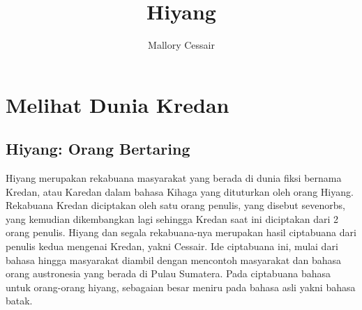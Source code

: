 \documentclass[12pt]{report}
\title{Hiyang}
\author{Mallory Cessair}
\begin{document}
 
\maketitle

\chapter{Melihat Dunia Kredan}
\section{Hiyang: Orang Bertaring}
Hiyang merupakan rekabuana masyarakat yang berada di dunia fiksi bernama Kredan, atau Karedan dalam bahasa Kihaga yang dituturkan oleh orang Hiyang. Rekabuana Kredan diciptakan oleh satu orang penulis, yang disebut sevenorbs, yang kemudian dikembangkan lagi sehingga Kredan saat ini diciptakan dari 2 orang penulis. Hiyang dan segala rekabuana-nya merupakan hasil ciptabuana dari penulis kedua mengenai Kredan, yakni Cessair. Ide ciptabuana ini, mulai dari bahasa hingga masyarakat diambil dengan mencontoh masyarakat dan bahasa orang austronesia yang berada di Pulau Sumatera. Pada ciptabuana bahasa untuk orang-orang hiyang, sebagaian besar meniru pada bahasa asli yakni bahasa batak.
\end{document}
